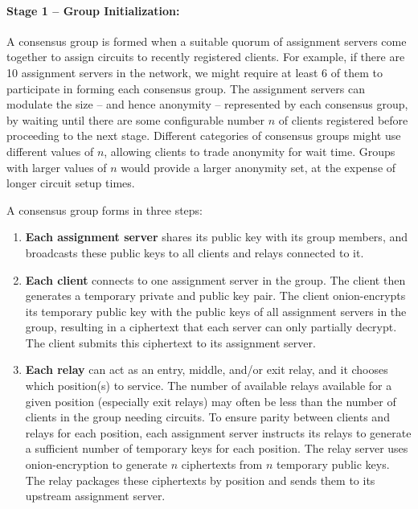 \paragraph{Stage 1 -- Group Initialization:}

A consensus group is formed when a suitable quorum of assignment servers come
together to assign circuits to recently registered clients.
For example, if there are 10 assignment servers in the network,
we might require at least 6 of them to participate
in forming each consensus group.
The assignment servers can modulate the size -- and hence anonymity --
represented by each consensus group,
by waiting until there are some configurable number $n$ of clients
registered before proceeding to the next stage.
Different categories of consensus groups might use different values of $n$,
allowing clients to trade anonymity for wait time.
Groups with larger values of $n$ would provide a larger
anonymity set, at the expense of longer circuit setup times.



A consensus group forms in three steps:

\begin{enumerate} 

\item \textbf{Each assignment server} shares its public key with its group
members, and broadcasts these public keys to all clients and relays
connected to it.

\item \textbf{Each client} connects to one assignment server in the group. The
client then generates a temporary private and public key pair.
The client onion-encrypts its temporary public key
with the public keys of all assignment
servers in the group, resulting in a ciphertext that each server can only partially
decrypt. The client submits this ciphertext to its assignment server.

\item \textbf{Each relay} can act as an entry, middle, and/or exit relay, and
it chooses which position(s) to service. The number of available
relays available for a given position (especially exit relays)
may often be less than the number of clients in the group needing circuits.
To ensure parity between
clients and relays for each position, each assignment server instructs its relays to generate a
sufficient number of temporary keys for each position. The relay server uses
onion-encryption to generate $n$ ciphertexts from $n$ temporary public keys.
The relay packages these ciphertexts by position
and sends them to its upstream assignment server.
\end{enumerate}

